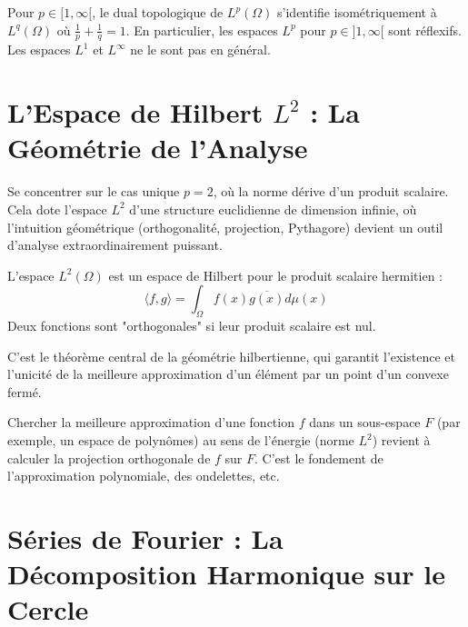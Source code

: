 \begin{theorem}
    Pour $p \in [1, \infty[$, le dual topologique de $L^p(\Omega)$ s'identifie isométriquement à $L^q(\Omega)$ où $\frac{1}{p}+\frac{1}{q}=1$. En particulier, les espaces $L^p$ pour $p \in ]1,\infty[$ sont réflexifs. Les espaces $L^1$ et $L^\infty$ ne le sont pas en général.
\end{theorem}

\section{L'Espace de Hilbert $L^2$ : La Géométrie de l'Analyse}

\begin{objectif}
    Se concentrer sur le cas unique $p=2$, où la norme dérive d'un produit scalaire. Cela dote l'espace $L^2$ d'une structure euclidienne de dimension infinie, où l'intuition géométrique (orthogonalité, projection, Pythagore) devient un outil d'analyse extraordinairement puissant.
\end{objectif}

\begin{definition}
    L'espace $L^2(\Omega)$ est un espace de Hilbert pour le produit scalaire hermitien :
    $$ \langle f, g \rangle = \int_\Omega f(x) \overline{g(x)} d\mu(x) $$
    Deux fonctions sont "orthogonales" si leur produit scalaire est nul.
\end{definition}

\begin{theorem}
    C'est le théorème central de la géométrie hilbertienne, qui garantit l'existence et l'unicité de la meilleure approximation d'un élément par un point d'un convexe fermé.
\end{theorem}

\begin{application}
    Chercher la meilleure approximation d'une fonction $f$ dans un sous-espace $F$ (par exemple, un espace de polynômes) au sens de l'énergie (norme $L^2$) revient à calculer la projection orthogonale de $f$ sur $F$. C'est le fondement de l'approximation polynomiale, des ondelettes, etc.
\end{application}

\section{Séries de Fourier : La Décomposition Harmonique sur le Cercle}

